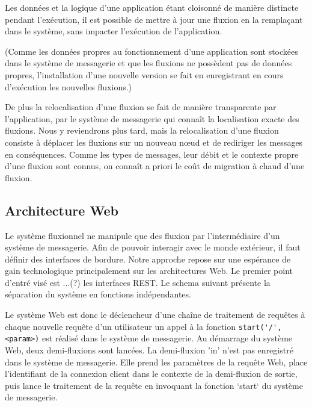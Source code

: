 		Les données et la logique d'une application étant cloisonné de manière distincte pendant l'exécution, il est possible de mettre à jour une fluxion en la remplaçant dans le système, sans impacter l'exécution de l'application.

		(Comme les données propres au fonctionnement d'une application sont stockées dans le système de messagerie et que les fluxions ne possèdent pas de données propres, l'installation d'une nouvelle version se fait en enregistrant en cours d'exécution les nouvelles fluxions.)

		De plus la relocalisation d'une fluxion se fait de manière transparente par l'application, par le système de messagerie qui connaît la localisation exacte des fluxions. Nous y reviendrons plus tard, mais la relocalisation d'une fluxion consiste à déplacer les fluxions sur un nouveau nœud et de rediriger les messages en conséquences. Comme les types de messages, leur débit et le contexte propre d'une fluxion sont connus, on connaît a priori le coût de migration à chaud d'une fluxion.

	\subsection{Architecture Web}

		Le système fluxionnel ne manipule que des fluxion par l'intermédiaire d'un système de messagerie. Afin de pouvoir interagir avec le monde extérieur, il faut définir des interfaces de bordure. Notre approche repose sur une espérance de gain technologique principalement sur les architectures Web. Le premier point d'entré visé est ...(?) les interfaces REST.
		Le schema suivant présente la séparation du système en fonctions indépendantes.


		Le système Web est donc le déclencheur d'une chaîne de traitement de requêtes à chaque nouvelle requête d'un utilisateur un appel à la fonction \lstinline|start('/', <param>)| est réalisé dans le système de messagerie.
		Au démarrage du système Web, deux demi-fluxions sont lancées.
		La demi-fluxion 'in' n'est pas enregistré dans le système de messagerie.
		Elle prend les paramètres de la requête Web, place l'identifiant de la connexion client dans le contexte de la demi-fluxion de sortie, puis lance le traitement de la requête en invoquant la fonction `start` du système de messagerie.

